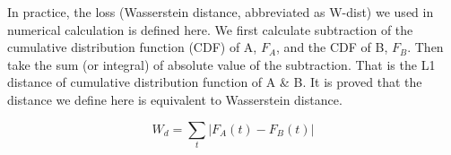In practice, the loss (Wasserstein distance, abbreviated as W-dist) we used in numerical calculation is defined here. We first calculate subtraction of the cumulative distribution function (CDF) of A, $F_{A}$, and the CDF of B, $F_{B}$. Then take the sum (or integral) of absolute value of the subtraction. That is the L1 distance of cumulative distribution function of A \& B. It is proved that the distance we define here is equivalent to Wasserstein distance. 

\begin{equation}
    W_{d}=\sum_t|F_{A}(t) - F_{B}(t)|
\end{equation}